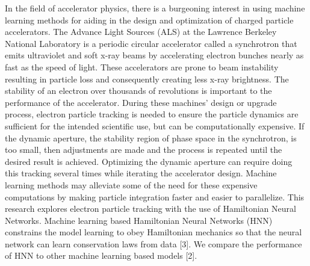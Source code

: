 \documentclass[11pt]{article}
\begin{document}
\medskip
In the field of accelerator physics, there is a burgeoning interest in using machine learning methods for aiding in the design and optimization of charged particle accelerators. The Advance Light Sources (ALS) at the Lawrence Berkeley National Laboratory is a periodic circular accelerator called a synchrotron that emits ultraviolet and soft x-ray beams by accelerating electron bunches nearly as fast as the speed of light. These accelerators are prone to beam instability resulting in particle loss and consequently creating less x-ray brightness. The stability of an electron over thousands of revolutions is important to the performance of the accelerator. During these machines' design or upgrade process, electron particle tracking is needed to ensure the particle dynamics are sufficient for the intended scientific use, but can be computationally expensive. If the dynamic aperture, the stability region of phase space in the synchrotron, is too small, then adjustments are made and the process is repeated until the desired result is achieved. Optimizing the dynamic aperture can require doing this tracking several times while iterating the accelerator design. Machine learning methods may alleviate some of the need for these expensive computations by making particle integration faster and easier to parallelize. This research explores electron particle tracking with the use of Hamiltonian Neural Networks. Machine learning based Hamiltonian Neural Networks (HNN) constrains the model learning to obey Hamiltonian mechanics so that the neural network can learn conservation laws from data [3]. We compare the performance of HNN to other machine learning based models [2]. 



\end{document}
